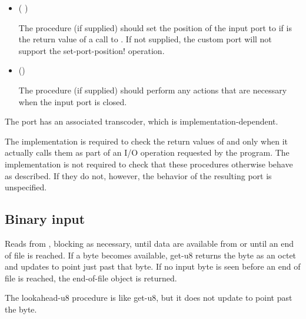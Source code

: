 \begin{entry}{%
}
\begin{itemize}
  The  procedure (if supplied) should return a single
  value.  The return value should represent the current position of
  the input port.  If not supplied, the custom port will not support
  the {\cf port-position} operation.
  
\item {\cf ( )}
       
  The  procedure (if supplied) should set the
  position of the input port to  if  is the return
  value of a call to .  If not supplied, the custom
  port will not support the {\cf set-port-position!} operation.
       
\item {\cf ()}
       
  The  procedure (if supplied) should perform any actions
  that are necessary when the input port is closed.
\end{itemize}

The port has an associated transcoder, which is implementation-dependent.

\implresp The implementation is required to check the return
values of  and  only when it actually calls
them as part of an I/O operation requested by the program.  The
implementation is not required to check that these procedures
otherwise behave as described.  If they do not, however, the behavior
of the resulting port is unspecified.
\end{entry}

\subsection{Binary input}

\begin{entry}{%
}
   
Reads from , blocking as necessary, until data are
available from  or until an end of file is reached.
If a byte becomes available, {\cf get-u8} returns the byte as an octet and
updates  to point just past that byte. If no input
byte is seen before an end of file is reached, the end-of-file
object is returned.
\end{entry}

\begin{entry}{%
}
   
The {\cf lookahead-u8} procedure is like {\cf get-u8}, but it does not 
update  to point past the byte.
\end{entry}

